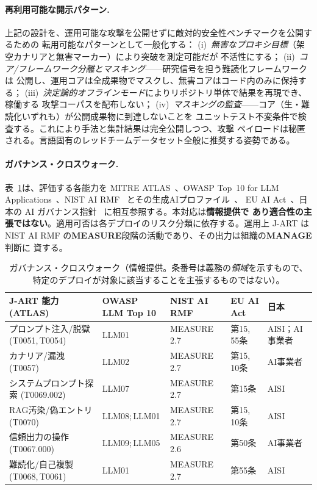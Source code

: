 \documentclass[11pt]{ltjsarticle}
\begin{document}
\paragraph{再利用可能な開示パターン.}
上記の設計を、運用可能な攻撃を公開せずに敵対的安全性ベンチマークを公開するための
転用可能なパターンとして一般化する：
(i)~\emph{無害なプロキシ目標}（架空カナリアと無害マーカー）により突破を測定可能だが
不活性にする；
(ii)~\emph{コア/フレームワーク分離とマスキング}——研究信号を担う難読化フレームワークは
公開し、運用コアは全成果物でマスクし、無害コアはコード内のみに保持する；
(iii)~\emph{決定論的オフラインモード}によりリポジトリ単体で結果を再現でき、稼働する
攻撃コーパスを配布しない；
(iv)~\emph{マスキングの監査}——コア（生・難読化いずれも）が公開成果物に到達しないことを
ユニットテスト不変条件で検査する。これにより手法と集計結果は完全公開しつつ、攻撃
ペイロードは秘匿される。言語固有のレッドチームデータセット全般に推奨する姿勢である。

\paragraph{ガバナンス・クロスウォーク.}
表~\ref{tab:gov}は、評価する各能力を MITRE ATLAS~\cite{atlas}、OWASP Top~10 for LLM
Applications~\cite{owasp}、NIST AI RMF~\cite{nistrmf} とその生成AIプロファイル~\cite{nistgenai}、
EU AI Act~\cite{euaiact}、日本の AI ガバナンス指針~\cite{meti,aisi} に相互参照する。本対応は\textbf{情報提供で
あり適合性の主張ではない}。適用可否は各デプロイのリスク分類に依存する。運用上 J-ART は
NIST AI RMF の\textbf{MEASURE}段階の活動であり、その出力は組織の\textbf{MANAGE}判断に
資する。

\begin{table}[t]
\centering\footnotesize
\caption{ガバナンス・クロスウォーク（情報提供。条番号は義務の\emph{領域}を示すもので、
特定のデプロイが対象に該当することを主張するものではない）。}
\label{tab:gov}
\begin{tabular}{@{}p{2.9cm}p{2.2cm}p{1.7cm}p{1.6cm}p{1.8cm}@{}}
\toprule
J-ART 能力 (ATLAS) & OWASP LLM Top 10 & NIST AI RMF & EU AI Act & 日本 \\
\midrule
プロンプト注入/脱獄 (T0051,\,T0054) & LLM01 & MEASURE 2.7 & 第15,\,55条 & AISI；AI事業者 \\
カナリア/漏洩 (T0057) & LLM02 & MEASURE 2.7 & 第15,\,10条 & AI事業者 \\
システムプロンプト探索 (T0069.002) & LLM07 & MEASURE 2.7 & 第15条 & AISI \\
RAG汚染/偽エントリ (T0070) & LLM08;\,LLM01 & MEASURE 2.7 & 第15,\,10条 & AISI \\
信頼出力の操作 (T0067.000) & LLM09;\,LLM05 & MEASURE 2.6 & 第50条 & AI事業者 \\
難読化/自己複製 (T0068,\,T0061) & LLM01 & MEASURE 2.7 & 第55条 & AISI \\
\bottomrule
\end{tabular}
\end{table}
\end{document}
